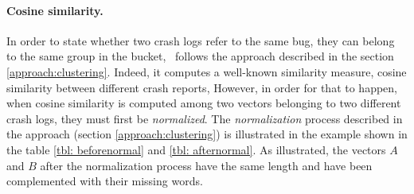 \paragraph{Cosine similarity.} 
In order to state whether two crash logs refer to the same bug, \ie they can belong to the same group in the bucket, \toolname\ follows the approach described in the section \ref{approach:clustering}. 
Indeed, it computes a well-known similarity measure, \ie cosine similarity \cite{cosine} between different crash reports,
However, in order for that to happen, when cosine similarity is computed among two vectors belonging to two different crash logs, they must first be \textit{normalized}. 
The \textit{normalization} process described in the approach (section \ref{approach:clustering}) is illustrated in the example shown in the table \ref{tbl: beforenormal} and \ref{tbl: afternormal}.
As illustrated, the vectors $A$ and $B$ after the normalization process have the same length and have been complemented with their missing words. 
